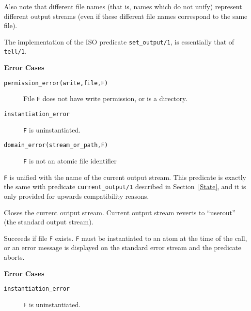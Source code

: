 \begin{description}
    Also note that different file names (that is, names which do not unify) 
    represent different output streams (even if these different file names 
    correspond to the same file).

    The implementation of the ISO predicate {\tt set\_output/1}, is
    essentially that of {\tt tell/1}.

{\bf Error Cases}
    \begin {description}
    \item[{\tt permission\_error(write,file,F)}]
	File {\tt F} does not have write permission, or is a directory.
    \item[{\tt instantiation\_error}]
	{\tt F} is uninstantiated.
    \item[{\tt domain\_error(stream\_or\_path,F)}]
    	{\tt F} is not an atomic file identifier
    \end{description}

    {\tt F} is unified with the name of the current output stream.
    This predicate is exactly the same with predicate {\tt current\_output/1}
    described in Section~\ref{State}, and it is only provided for
    upwards compatibility reasons.

    Closes the current output stream. 
    Current output stream reverts to ``userout'' (the standard output stream).

    Succeeds if file {\tt F} exists. {\tt F} must be instantiated to
    an atom at the time of the call, or an error message is displayed on
    the standard error stream and the predicate aborts.

{\bf Error Cases}
    \begin {description}
    \item[{\tt instantiation\_error}]
	{\tt F} is uninstantiated.
    \end{description}

\end{description}


